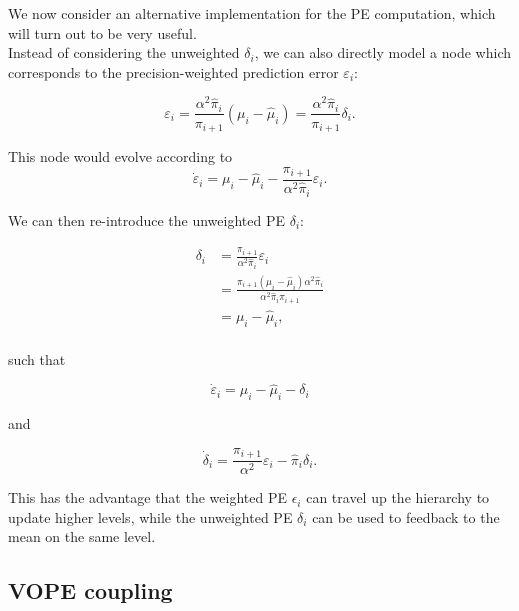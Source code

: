 We now consider an alternative implementation for the \textsf{PE} computation, which will turn out to be very useful.\\

Instead of considering the unweighted $\delta_i$, we can also directly model a node which corresponds to the precision-weighted prediction error $\varepsilon_i$:

\begin{equation}
	\varepsilon_i = \frac{\alpha^2 \hat{\pi}_i}{\pi_{i+1}} (\mu_i - \hat{\mu}_i) = \frac{\alpha^2 \hat{\pi}_i}{\pi_{i+1}} \delta_i.
\end{equation}

This node would evolve according to
\begin{equation}
	\dot{\varepsilon}_i = \mu_i - \hat{\mu}_i -  \frac{\pi_{i+1}}{\alpha^2 \hat{\pi}_i} \varepsilon_i.
\end{equation}

We can then re-introduce the unweighted \textsf{PE} $\delta_i$:

\begin{equation}
	\begin{split}
		\delta_i &= \frac{\pi_{i+1}}{\alpha^2 \hat{\pi}_i} \varepsilon_i \\
		&= \frac{\pi_{i+1} (\mu_i - \hat{\mu}_i) \alpha^2 \hat{\pi}_i}{\alpha^2 \hat{\pi}_i \pi_{i+1}}\\
		&= \mu_i - \hat{\mu}_i,\\
	\end{split}
\end{equation}

such that

\begin{equation}
	\dot{\varepsilon}_i = \mu_i - \hat{\mu}_i - \delta_i
\end{equation}

and

\begin{equation}
	\dot{\delta}_i = \frac{\pi_{i+1}}{\alpha^2} \varepsilon_i - \hat{\pi}_i \delta_i.
\end{equation}

This has the advantage that the weighted \textsf{PE} $\epsilon_i$ can travel up the hierarchy to update higher levels, while the unweighted \textsf{PE} $\delta_i$ can be used to feedback to the mean on the same level. 


\subsection{VOPE coupling}